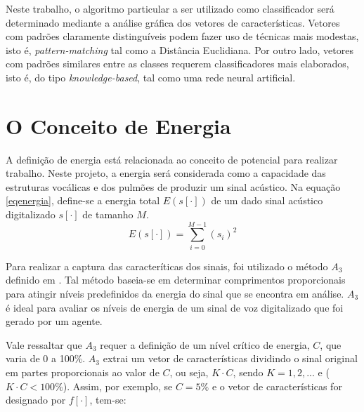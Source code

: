\documentclass[a4paper,12pt,twoside,openright]{report}
\begin{document}
\par Neste trabalho, o algoritmo particular a ser utilizado como classificador ser\'{a} determinado mediante a an\'{a}lise gr\'{a}fica dos vetores de caracter\'{i}sticas. Vetores com padr\~{o}es claramente distingu\'{i}veis podem fazer uso de t\'{e}cnicas mais modestas, isto \'{e}, \textit{pattern-matching} tal como a Dist\^{a}ncia Euclidiana. Por outro lado, vetores com padr\~{o}es similares entre as classes requerem classificadores mais elaborados, isto \'{e}, do tipo \textit{knowledge-based}, tal como uma rede neural artificial. 
\section{O Conceito de Energia}
\par A defini{\c c}\~{a}o de energia est\'{a} relacionada ao conceito de potencial para realizar trabalho. Neste projeto, a energia ser\'{a} considerada como a capacidade das estruturas voc\'{a}licas e dos pulm\~{o}es de produzir um sinal ac\'{u}stico. Na equa{\c c}\~{a}o \ref{eqenergia}, define-se a energia total $E(s[\cdot])$ de um dado sinal ac\'{u}stico digitalizado $s[\cdot]$ de tamanho $M$.
\begin{equation}
E(s[\cdot])=\sum_{i=0}^{M-1} (s_i)^2
\label{eqenergia}
\end{equation}
\par Para realizar a captura das caracter\'{i}ticas dos sinais, foi utilizado o m\'{e}todo $A_3$ definido em \cite{tut_energia}. Tal m\'{e}todo baseia-se em determinar comprimentos proporcionais para atingir n\'{i}veis predefinidos da energia do sinal que se encontra em an\'{a}lise. $A_3$ \'{e} ideal para avaliar os n\'{i}veis de energia de um sinal de voz digitalizado que foi gerado por um agente.
\\
\par Vale ressaltar que $A_3$ requer a defini\c{c}\~{a}o de um n\'{i}vel cr\'{i}tico de energia, $C$, que varia de 0 a 100\%. $A_3$ extrai um vetor de caracter\'{i}sticas dividindo o sinal original em partes proporcionais ao valor de $C$, ou seja, $K \cdot C$, sendo $K=1, 2, ...$ e ($K \cdot C < 100\%$). Assim, por exemplo, se $C=5\%$ e o vetor de caracter\'{i}sticas for designado por $f[\cdot]$, tem-se:
\end{document}
